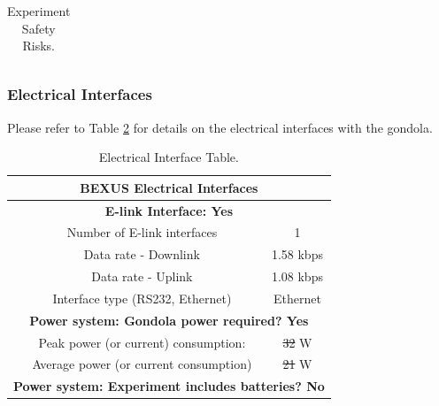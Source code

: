 \documentclass[a4paper,12pt,oneside]{article} %
\providecommand{\DIFaddtex}[1]{{\protect\color{blue}\uwave{#1}}} %
\providecommand{\DIFdeltex}[1]{{\protect\color{red}\sout{#1}}}                      %
\providecommand{\DIFaddbegin}{} %
\providecommand{\DIFaddend}{} %
\providecommand{\DIFdelbegin}{} %
\providecommand{\DIFdelend}{} %
\providecommand{\DIFaddFL}[1]{\DIFadd{#1}} %
\providecommand{\DIFdelFL}[1]{\DIFdel{#1}} %
\providecommand{\DIFaddbeginFL}{} %
\providecommand{\DIFaddendFL}{} %
\providecommand{\DIFdelbeginFL}{} %
\providecommand{\DIFdelendFL}{} %
\providecommand{\DIFadd}[1]{\texorpdfstring{\DIFaddtex{#1}}{#1}} %
\providecommand{\DIFdel}[1]{\texorpdfstring{\DIFdeltex{#1}}{}} %
\newcommand{\DIFscaledelfig}{0.5}
\newlength{\DIFdelgraphicswidth} %
\newlength{\DIFdelgraphicsheight} %
\newcommand{\DIFaddincludegraphics}[2][]{{\color{blue}\fbox{\DIFOincludegraphics[#1]{#2}}}} %
\newcommand{\DIFdelincludegraphics}[2][]{%
\sbox{\DIFdelgraphicsbox}{\DIFOincludegraphics[#1]{#2}}%
\settoboxwidth{\DIFdelgraphicswidth}{\DIFdelgraphicsbox} %
\settoboxtotalheight{\DIFdelgraphicsheight}{\DIFdelgraphicsbox} %
\scalebox{\DIFscaledelfig}{%
\parbox[b]{\DIFdelgraphicswidth}{\usebox{\DIFdelgraphicsbox}\\[-\baselineskip] \rule{\DIFdelgraphicswidth}{0em}}\llap{\resizebox{\DIFdelgraphicswidth}{\DIFdelgraphicsheight}{%
\setlength{\unitlength}{\DIFdelgraphicswidth}%
\begin{picture}(1,1)%
\thicklines\linethickness{2pt} %
{\color[rgb]{1,0,0}\put(0,0){\framebox(1,1){}}}%
{\color[rgb]{1,0,0}\put(0,0){\line( 1,1){1}}}%
{\color[rgb]{1,0,0}\put(0,1){\line(1,-1){1}}}%
\end{picture}%
}\hspace*{3pt}}} %
} %
\DeclareRobustCommand{\DIFaddbegin}{\DIFOaddbegin \let\includegraphics\DIFaddincludegraphics} %
\DeclareRobustCommand{\DIFaddend}{\DIFOaddend \let\includegraphics\DIFOincludegraphics} %
\DeclareRobustCommand{\DIFdelbegin}{\DIFOdelbegin \let\includegraphics\DIFdelincludegraphics} %
\DeclareRobustCommand{\DIFdelend}{\DIFOaddend \let\includegraphics\DIFOincludegraphics} %
\DeclareRobustCommand{\DIFaddbeginFL}{\DIFOaddbeginFL \let\includegraphics\DIFaddincludegraphics} %
\DeclareRobustCommand{\DIFaddendFL}{\DIFOaddendFL \let\includegraphics\DIFOincludegraphics} %
\DeclareRobustCommand{\DIFdelbeginFL}{\DIFOdelbeginFL \let\includegraphics\DIFdelincludegraphics} %
\DeclareRobustCommand{\DIFdelendFL}{\DIFOaddendFL \let\includegraphics\DIFOincludegraphics} %
\begin{document}
\begin{longtable}{|m{}|m{}|m{}|}
\DIFaddendFL \caption{Experiment Safety Risks.}
\label{tab:safrisk}
\DIFdelbeginFL %
\DIFdelend \DIFaddbegin \end{longtable}
\DIFaddend \raggedbottom

\DIFdelbegin %
\DIFdelend \subsubsection{Electrical Interfaces}

Please refer to Table \ref{tab:electrical-interface-table} for details on the electrical interfaces with the gondola.


\begin{table}[H]
\centering
\begin{tabular}{|c|c|c|}
\hline
\multicolumn{3}{|c|}{\textbf{BEXUS Electrical Interfaces}}                     \\ \hline
\multicolumn{3}{|c|}{\textbf{E-link Interface: Yes}}                           \\ \hline
\multirow{4}{*}{}    & Number of E-link interfaces               & 1           \\ \cline{2-3} 
                     & Data rate - Downlink                      & 1.58 kbps     \\ \cline{2-3} 
                     & Data rate - Uplink                        & 1.08 kbps      \\ \cline{2-3} 
                     & Interface type (RS232, Ethernet)          & Ethernet    \\ \hline
\multicolumn{3}{|c|}{\textbf{Power system: Gondola power required? Yes}}       \\ \hline
\multirow{2}{*}{}    & Peak power (or current) consumption:      & \DIFdelbeginFL \DIFdelFL{32 }\DIFdelendFL \DIFaddbeginFL \DIFaddFL{38 }\DIFaddendFL W            \\ \cline{2-3} 
                     & Average power (or current consumption)    & \DIFdelbeginFL \DIFdelFL{21 }\DIFdelendFL \DIFaddbeginFL \DIFaddFL{24 }\DIFaddendFL W            \\ \hline
\multicolumn{3}{|l|}{\textbf{Power system: Experiment includes batteries? No}} \\ \hline
\end{tabular}
\caption{Electrical Interface Table.}
\label{tab:electrical-interface-table}
\end{table}
\raggedbottom
\end{document}
